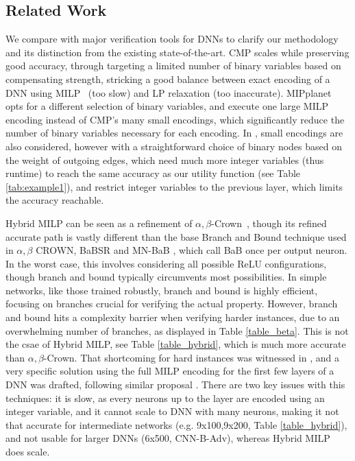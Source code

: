 \subsection{Related Work} 

We compare {\CMP} with major verification tools for DNNs to clarify our methodology and its distinction from the existing state-of-the-art. CMP scales while preserving good accuracy, through targeting a limited number of binary variables based on compensating strength, stricking a good balance between exact encoding of a DNN using MILP~\cite{MILP} (too slow) and LP relaxation (too inaccurate). MIPplanet~\cite{MIPplanet} opts for a different selection of binary variables, and execute one large MILP encoding instead of CMP's many small encodings, which significantly reduce the number of binary variables necessary for each encoding. In \cite{DivideAndSlide}, small encodings are also considered, however with a straightforward choice of binary nodes based on the weight of outgoing edges, which need much more integer variables (thus runtime) to reach the same accuracy as our utility function (see Table \ref{tab:example1}), and restrict integer variables to the previous layer, which limits the accuracy reachable.

Hybrid MILP can be seen as a refinement of $\alpha,\beta$-Crown~\cite{crown}, though its refined accurate path is vastly different than the base Branch and Bound technique used in 
$\alpha,\beta$ CROWN, BaBSR \cite{BaB} and MN-BaB \cite{ferrari2022complete}, which call BaB once per output neuron. In the worst case, this involves considering all possible ReLU configurations, though branch and bound typically circumvents most possibilities. In simple networks, like those trained robustly, branch and bound is highly efficient, focusing on branches crucial for verifying the actual property. However, branch and bound hits a complexity barrier when verifying harder instances, due to an overwhelming number of branches, as displayed in Table \ref{table_beta}. This is not the csae of Hybrid MILP, see Table \ref{table_hybrid}, which is much more accurate than $\alpha,\beta$-Crown.
That shortcoming for hard instances was witnessed in \cite{crown}, and a very specific solution using the full MILP encoding for the first few layers of a DNN was drafted, following similar proposal \cite{MILP2}. There are two key issues with this techniques: it is slow, as every neurons up to the layer are encoded using an integer variable, and it cannot scale to DNN with many neurons, making it not that accurate for intermediate networks (e.g. 9x100,9x200, Table \ref{table_hybrid}), and not usable for larger DNNs (6x500, CNN-B-Adv), whereas Hybrid MILP does scale.


